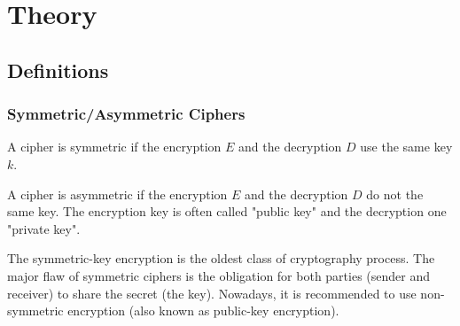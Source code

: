 \chapter{Theory}

\section{Definitions}

\subsection{Symmetric/Asymmetric Ciphers}

\begin{mydef}
\begin{minipage}[t]{0.8\textwidth}
    A cipher is symmetric if the encryption $E$ and the decryption $D$ use the same key $k$.
\end{minipage}
\end{mydef}

\begin{mydef}
\begin{minipage}[t]{0.8\textwidth}
    A cipher is asymmetric if the encryption $E$ and the decryption $D$ do not the same key. The encryption key is often called "public key" and the decryption one "private key".
\end{minipage}
\end{mydef}

The symmetric-key encryption is the oldest class of cryptography process. The major flaw of symmetric ciphers is the obligation for both parties (sender and receiver) to share the secret (the key). Nowadays, it is recommended to use non-symmetric encryption (also known as public-key encryption).




